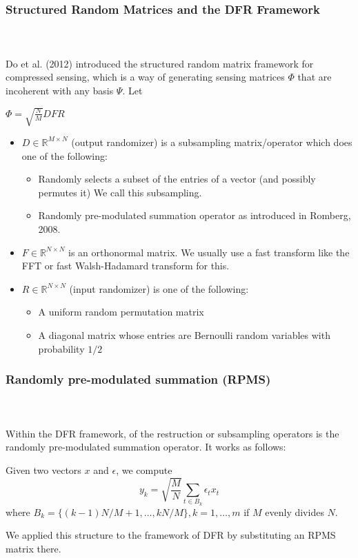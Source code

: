 


\begin{frame}[t]
	\frametitle{Structured Random Matrices and the DFR Framework}
	\framesubtitle{~~}  %

	Do et al. (2012) introduced the structured random matrix framework for compressed sensing,
	which is a way of generating sensing matrices $\Phi$ that are incoherent with any basis $\Psi$. Let 

	\centering
	$	\Phi = \sqrt{\frac{N}{M}}DFR$

	\begin{itemize}
	\item $D\in \mathbb{R}^{M\times N}$ (output randomizer) is a subsampling matrix/operator which does one of the following:
		\begin{itemize}
		\item Randomly selects a subset of the entries of a vector (and possibly permutes it) We call this subsampling.
		\item Randomly pre-modulated summation operator as introduced in Romberg, 2008.
		\end{itemize}
	\item $F\in\mathbb{R}^{N\times N}$ is an orthonormal matrix. We usually use a fast transform like the FFT or 
		fast Walsh-Hadamard transform for this.
	\item $R\in\mathbb{R}^{N\times N}$ (input randomizer) is one of the following:
		\begin{itemize}
			\item A uniform random permutation matrix
			\item A diagonal matrix whose entries are Bernoulli random variables with probability $1/2$
		\end{itemize}
	\end{itemize}

\end{frame}

\begin{frame}[t]
	\frametitle{Randomly pre-modulated summation (RPMS)}
	\framesubtitle{~~}  %
	
	Within the DFR framework, of the restruction or subsampling operators is the
	randomly pre-modulated summation operator. It works as follows:

	Given two vectors $x$ and $\epsilon$, we compute
	\begin{equation}
		y_k = \sqrt{\frac{M}{N}}\sum_{t\in B_k}\epsilon_t x_t
	\end{equation}
	where
	$B_k = \{(k-1)N/M + 1, \ldots, kN/M  \}, k = 1,\ldots,m$ if $M$ evenly divides $N$.

	We applied this structure to the framework of DFR by substituting an RPMS matrix there.

\end{frame}

